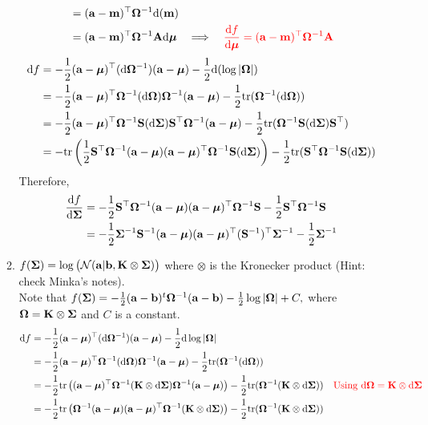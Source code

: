 \documentclass[12pt, fullpage,letterpaper]{article}
\def\red{\color{red}}
\def\blackblue{\color{black!40!blue}}
\begin{document}
\begin{enumerate}
\begin{enumerate}
{\begin{align*}
	& = (\a-\m)^\top\bOmega^{-1}\d(\m)\\
	& = (\a-\m)^\top\bOmega^{-1}\A\d\bmu \quad\Longrightarrow\quad {\red{\d f\over \d\bmu} = (\a-\m)^\top\bOmega^{-1}\A}
	\end{align*}
	\begin{align*}
	{\rm d} f
	& = -{1\over 2}({\bf a}-\boldsymbol{\mu})^\top ({\rm d}\mathbf{\Omega}^{-1})({\bf a}-\boldsymbol{\mu}) -{1\over 2}{\rm d}(\log|\mathbf{\Omega}|) \\
	& =  -{1\over 2}({\bf a}-\boldsymbol{\mu})^\top \mathbf{\Omega}^{-1}({\rm d}\mathbf{\Omega})\mathbf{\Omega}^{-1}({\bf a}-\boldsymbol{\mu}) -{1\over 2}{\rm tr}(\mathbf{\Omega}^{-1}({\rm d}\mathbf{\Omega}))\\
	& =  -{1\over 2}({\bf a}-\boldsymbol{\mu})^\top \mathbf{\Omega}^{-1}{\bf S}({\rm d}\boldsymbol{\Sigma}){\bf S}^\top\mathbf{\Omega}^{-1}({\bf a}-\boldsymbol{\mu}) - {1\over 2}{\rm tr}(\mathbf{\Omega}^{-1}{\bf S}({\rm d}\boldsymbol{\Sigma}){\bf S}^\top)\\
	& =  -{\rm tr}\left({1\over 2}{\bf S}^\top\mathbf{\Omega}^{-1}({\bf a}-\boldsymbol{\mu})({\bf a}-\boldsymbol{\mu})^\top \mathbf{\Omega}^{-1}{\bf S}({\rm d}\boldsymbol{\Sigma})\right) - {1\over 2}{\rm tr}({\bf S}^\top\mathbf{\Omega}^{-1}{\bf S}({\rm d}\boldsymbol{\Sigma}))
	\end{align*}
	Therefore, 
	\begin{align*}
	{{\rm d}f\over {\rm d}\boldsymbol{\Sigma}} & = -{1\over 2}{\bf S}^\top\mathbf{\Omega}^{-1}({\bf a}-\boldsymbol{\mu})({\bf a}-\boldsymbol{\mu})^\top \mathbf{\Omega}^{-1}{\bf S} - {1\over 2}{\bf S}^\top\mathbf{\Omega}^{-1}{\bf S}\\
	& =-{1\over 2}\boldsymbol{\Sigma}^{-1}{\bf S}^{-1}({\bf a}-\boldsymbol{\mu})({\bf a}-\boldsymbol{\mu})^\top ({\bf S}^{-1})^\top\boldsymbol{\Sigma}^{-1} -{1\over 2}\boldsymbol{\Sigma}^{-1}
	\end{align*}
	}
	\item $f(\boldsymbol{\Sigma}) = \log\big(\mathcal{N}({\bf a}|{\bf b}, {\bf K}\otimes \boldsymbol{\Sigma})\big)$ where $\otimes$ is the Kronecker product 
	(Hint: check Minka's notes).\\
	{\blackblue\noindent  
	Note that 
	$f(\boldsymbol{\Sigma}) = -\frac{1}{2}({\bf a}-{\bf b})^t\mathbf{\Omega}^{-1}({\bf a}-{\bf b}) -{1\over 2}\log |\mathbf{\Omega}| +C,$ where  $\mathbf{\Omega} = {\bf K}\otimes \boldsymbol{\Sigma}$ and $C$ is a constant.
	\begin{align*}
	\d f
	& = -{1\over 2}(\a-\bmu)^\top (\d\bOmega^{-1})(\a-\bmu) -{1\over 2}\d\log|\bOmega| \\
	& =  -{1\over 2}(\a-\bmu)^\top \bOmega^{-1}(\d\bOmega)\bOmega^{-1}(\a-\bmu) -{1\over 2}{\rm tr}(\bOmega^{-1}(\d\bOmega))\\
	& =  -{1\over 2}{\rm tr}\left((\a-\bmu)^\top \bOmega^{-1}(\K\otimes \d\bSigma)\bOmega^{-1}(\a-\bmu)\right) - {1\over 2}{\rm tr}(\bOmega^{-1}(\K\otimes \d\bSigma)) \quad \mbox{\red Using $\d\bOmega = \K\otimes \d\bSigma$}\\
	& =  -{1\over 2}{\rm tr}\left(\bOmega^{-1}(\a-\bmu)(\a-\bmu)^\top \bOmega^{-1}(\K\otimes \d\bSigma)\right) - {1\over 2}{\rm tr}(\bOmega^{-1}(\K\otimes \d\bSigma))

\end{align*}}
\end{enumerate}
\end{enumerate}
\end{document}
